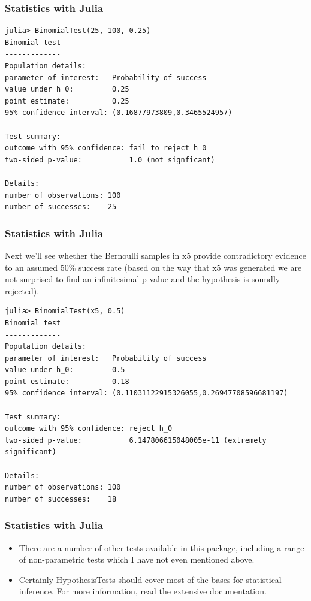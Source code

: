 \documentclass[Master.tex]{subfiles}
\begin{document}
\begin{frame}[fragile]
	\frametitle{Statistics with Julia}
	\large
\begin{verbatim}
julia> BinomialTest(25, 100, 0.25)
Binomial test
-------------
Population details:
parameter of interest:   Probability of success
value under h_0:         0.25
point estimate:          0.25
95% confidence interval: (0.16877973809,0.3465524957)

Test summary:
outcome with 95% confidence: fail to reject h_0
two-sided p-value:           1.0 (not signficant)

Details:
number of observations: 100
number of successes:    25
\end{verbatim}
\end{frame}
\begin{frame}
	\frametitle{Statistics with Julia}
	\large

Next we’ll see whether the Bernoulli samples in x5 provide contradictory evidence to an assumed 50\% success rate (based on the way that x5 was generated we are not surprised to find an infinitesimal p-value and the hypothesis is soundly rejected).

\end{frame}
\begin{frame}[fragile]
	\begin{verbatim}
julia> BinomialTest(x5, 0.5)
Binomial test
-------------
Population details:
parameter of interest:   Probability of success
value under h_0:         0.5
point estimate:          0.18
95% confidence interval: (0.11031122915326055,0.26947708596681197)

Test summary:
outcome with 95% confidence: reject h_0
two-sided p-value:           6.147806615048005e-11 (extremely significant)

Details:
number of observations: 100
number of successes:    18
\end{verbatim}
\end{frame}
\begin{frame}
	\frametitle{Statistics with Julia}
	\large
\begin{itemize}
\item There are a number of other tests available in this package, including a range of non-parametric tests which I have not even mentioned above. 
\item Certainly HypothesisTests should cover most of the bases for statistical inference. For more information, read the extensive documentation.
\end{itemize}
\end{frame}

\end{document}
